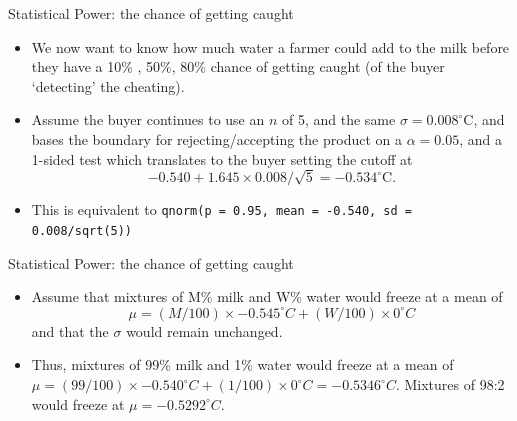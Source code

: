 \documentclass{beamer}\usepackage[]{graphicx}\usepackage[]{color}
\begin{document}
\begin{frame}{Statistical Power: the chance of getting caught}

\begin{itemize}
		\setlength\itemsep{1em}
	\item We now want to know how much water a farmer could add to the milk before they have a 10\% , 50\%, 80\% chance of getting caught (of the buyer `detecting' the cheating). 
	\item Assume the buyer continues to use an $n$ of 5, and the same $\sigma =0.008^{\circ}$C, and  bases the boundary for rejecting/accepting the product on a $\alpha = 0.05$, and a 1-sided test which translates to the buyer setting the cutoff at $$-0.540 + 1.645 \times 0.008/\sqrt{5}  = -0.534^{\circ}\textrm{C}.$$ 
	\item This is equivalent to \texttt{qnorm(p = 0.95, mean = -0.540, sd = 0.008/sqrt(5))}

\end{itemize}
\end{frame}


\begin{frame}{Statistical Power: the chance of getting caught}
\small
\begin{itemize}
	\setlength\itemsep{1em}
	\item Assume that  mixtures of M\% milk and W\% water  would freeze at a mean of $$\mu =  (M/100) \times -0.545^{\circ}C + (W/100) \times 0 ^{\circ}C$$ and that the $\sigma$ would remain unchanged. 
	\item Thus, mixtures of 99\% milk and 1\% water  would freeze at a mean of $\mu =  (99/100) \times -0.540^{\circ}C + (1/100) \times 0 ^{\circ}C = -0.5346 ^{\circ} C.$ Mixtures of 98:2  would freeze at $\mu =  -0.5292^{\circ}C.$  
\end{itemize}
\end{frame}
\end{document}
